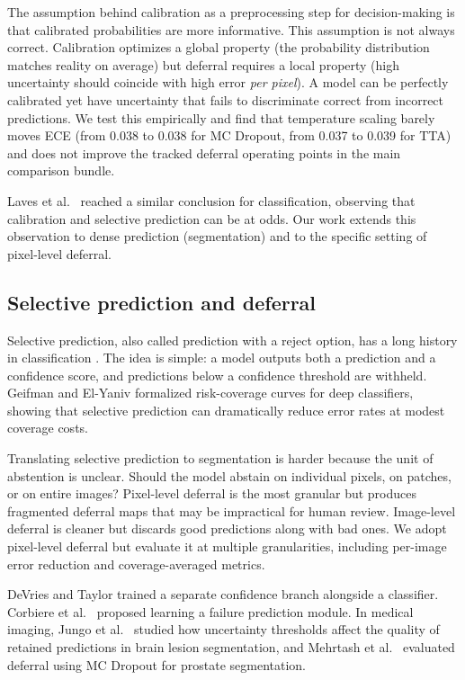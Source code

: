 The assumption behind calibration as a preprocessing step for decision-making
is that calibrated probabilities are more informative. This assumption is not
always correct. Calibration optimizes a global property (the probability
distribution matches reality on average) but deferral requires a local
property (high uncertainty should coincide with high error \emph{per pixel}).
A model can be perfectly calibrated yet have uncertainty that fails to
discriminate correct from incorrect predictions. We test this empirically
and find that temperature scaling barely moves ECE (from 0.038 to 0.038 for
MC Dropout, from 0.037 to 0.039 for TTA) and does not improve the tracked
deferral operating points in the main comparison bundle.

Laves et al.\ \citep{laves2020well} reached a similar conclusion for
classification, observing that calibration and selective prediction can be
at odds. Our work extends this observation to dense prediction (segmentation)
and to the specific setting of pixel-level deferral.

\subsection{Selective prediction and deferral}

Selective prediction, also called prediction with a reject option, has a long
history in classification \citep{chow1970optimum,el2010foundations}. The idea
is simple: a model outputs both a prediction and a confidence score, and
predictions below a confidence threshold are withheld. Geifman and El-Yaniv
\citep{geifman2017selective} formalized risk-coverage curves for deep
classifiers, showing that selective prediction can dramatically reduce error
rates at modest coverage costs.

Translating selective prediction to segmentation is harder because the unit
of abstention is unclear. Should the model abstain on individual pixels, on
patches, or on entire images? Pixel-level deferral is the most granular but
produces fragmented deferral maps that may be impractical for human review.
Image-level deferral is cleaner but discards good predictions along with
bad ones. We adopt pixel-level deferral but evaluate it at multiple
granularities, including per-image error reduction and coverage-averaged
metrics.

DeVries and Taylor \citep{devries2018learning} trained a separate confidence
branch alongside a classifier. Corbiere et al.\ \citep{corbiere2019addressing}
proposed learning a failure prediction module. In medical imaging, Jungo et al.\
\citep{jungo2020analyzing} studied how uncertainty thresholds affect the
quality of retained predictions in brain lesion segmentation, and
Mehrtash et al.\ \citep{mehrtash2020confidence} evaluated deferral using
MC Dropout for prostate segmentation.

